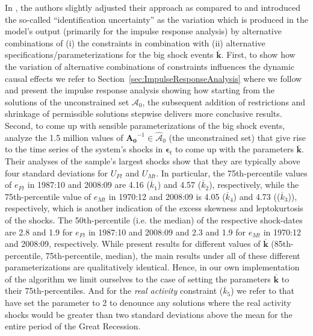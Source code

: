 \documentclass[a4paper,11pt,listof=nochaptergap,oneside,pointednumbers,bibtotoc,bigheadings,liststotoc,hidelinks]{scrbook}
\theoremstyle{mysatz}
\theoremstyle{mydefinition}
\theoremstyle{mytheorem}
\theoremstyle{mybemerkung}
\let\oldhat\hat
\newcommand{\vect}[1]{\boldsymbol{\mathbf{#1}}}
\newcommand{\hatt}[1]{\oldhat{\boldsymbol{\mathbf{#1}}}}
\begin{document}
In \citet{ludvigsonetal:19}, the authors slightly adjusted their approach as compared to \citet{ludvigsonetal:18} and introduced the so-called ``identification uncertainty'' as the variation which is produced in the model's output (primarily for the impulse response analysis) by alternative combinations of (i) the constraints in combination with (ii) alternative specifications/parameterizations for the big shock events $\overline{\vect{k}}$. First, to show how the variation of alternative combinations of constraints influences the dynamic causal effects we refer to Section~\ref{sec:ImpulseResponseAnalysis} where we follow \citet{ludvigsonetal:19} and present the impulse response analysis showing how starting from the solutions of the unconstrained set $\vect{\mathcal{A}}_0$, the subsequent addition of restrictions and shrinkage of permissible solutions stepwise delivers more conclusive results. Second, to come up with sensible parameterizations of the big shock events, \citet{ludvigsonetal:19} analyze the 1.5 million values of $\vect{A_0}^{-1} \in \hatt{\mathcal{A}}_0$ (the unconstrained set) that give rise to the time series of the system's shocks in $\vect{\epsilon}_t$ to come up with the parameters $\overline{\vect{k}}$. Their analyses of the sample's largest shocks show that they are typically above four standard deviations for $U_{Ft}$ and $U_{Mt}$. In particular, the 75th-percentile values of $e_{Ft}$ in 1987:10 and 2008:09 are 4.16 ($\overline{k}_1$) and 4.57 ($\overline{k}_2$), respectively, while the 75th-percentile value of $e_{Mt}$ in 1970:12 and 2008:09 is 4.05 ($\overline{k}_4$) and 4.73 (($\overline{k}_3$)), respectively, which is another indication of the excess skewness and leptokurtosis of the shocks. The 50th-percentile (i.e. the median) of the respective shock-dates are 2.8 and 1.9 for $e_{Ft}$ in 1987:10 and 2008:09 and 2.3 and 1.9 for $e_{Mt}$ in 1970:12 and 2008:09, respectively. While \citet{ludvigsonetal:19} present results for different values of $\overline{\vect{k}}$ (85th-percentile, 75th-percentile, median), the main results under all of these different parameterizations are qualitatively identical. Hence, in our own implementation of the algorithm we limit ourselves to the case of setting the parameters $\overline{\vect{k}}$ to their 75th-percentiles. And for the \textit{real activity} constraint ($\overline{k}_5$) we refer to \citet{ludvigsonetal:18} that have set the parameter to 2 to denounce any solutions where the real activity shocks would be greater than two standard deviations above the mean for the entire period of the Great Recession.
\end{document}
